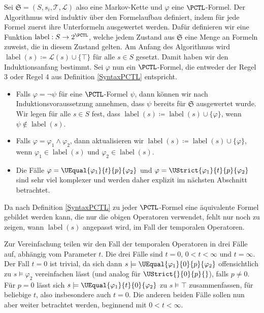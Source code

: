 Sei $\mathfrak{S}=(S,s_i,\mathcal{T},\mathcal{L})$ also eine Markov-Kette und $\varphi$ eine $\PCTL$-Formel. 
Der Algorithmus wird induktiv über den Formelaufbau definiert, indem für jede Formel zuerst ihre Unterformeln ausgewertet werden. 
Dafür definieren wir eine Funktion $\operatorname{label}:S\to 2^\PCTL$, welche jedem Zustand aus $\mathfrak{S}$ eine Menge an Formeln zuweist, die in diesem Zustand gelten.
Am Anfang des Algorithmus wird $\operatorname{label}(s)\coloneqq\mathcal{L}(s)\cup\{\top\}$ für alle $s\in S$ gesetzt. Damit haben wir den Induktionsanfang bestimmt. Sei $\varphi$ nun ein $\PCTL$-Formel, die entweder der Regel 3 oder Regel 4 aus Definition \ref{SyntaxPCTL} entspricht.
\begin{itemize}
	\item Falls $\varphi=\neg\psi$ für eine $\PCTL$-Formel $\psi$, dann können wir nach Induktionsvoraussetzung annehmen, dass $\psi$ bereits für $\mathfrak{S}$ ausgewertet wurde. Wir legen für alle $s\in S$ fest, dass $\operatorname{label}(s)\coloneqq \operatorname{label}(s) \cup\{\varphi\}$, wenn $\psi \notin \operatorname{label}(s)$.
	\item Falls $\varphi = \varphi_1\land\varphi_2$, dann aktualisieren wir $\operatorname{label}(s)\coloneqq \operatorname{label}(s) \cup \{\varphi\}$, wenn $\varphi_1\in \operatorname{label}(s)$ und $\varphi_2\in \operatorname{label}(s)$.
	\item Die Fälle $\varphi = \UEqual{\varphi_1}{t}{p}{\varphi_2}$ und $\varphi = \UStrict{\varphi_1}{t}{p}{\varphi_2}$ sind sehr viel komplexer und werden daher explizit im nächsten Abschnitt betrachtet.
\end{itemize}
Da nach Definition \ref{SyntaxPCTL} zu jeder $\PCTL$-Formel eine äquivalente Formel gebildet werden kann, die nur die obigen Operatoren verwendet, fehlt nur noch zu zeigen, wann $\operatorname{label}(s)$ angepasst wird, im Fall der temporalen Operatoren. \cite{hansson1994logic}

Zur Vereinfachung teilen wir den Fall der temporalen Operatoren in drei Fälle auf, abhängig vom Parameter $t$. Die drei Fälle sind $t=0$, $0<t<\infty$ und $t=\infty$.
Der Fall $t=0$ ist trivial, da sich dann $s \models \UEqual{\varphi_1}{0}{p}{\varphi_2}$ offensichtlich zu $s \models \varphi_2$ vereinfachen lässt (und analog für $\UStrict{}{0}{p}{}$), falls $p\neq0$.
Für $p=0$ lässt sich $s\models \UEqual{\varphi_1}{t}{0}{\varphi_2}$ zu $s\models \top$ zusammenfassen, für beliebige $t$, also insbesondere auch $t=0$.
Die anderen beiden Fälle sollen nun aber weiter betrachtet werden, beginnend mit $0<t<\infty$.

